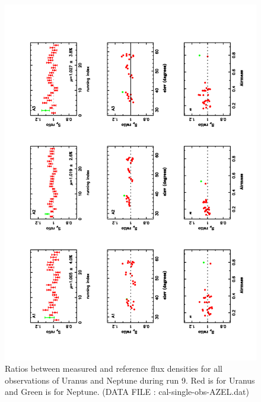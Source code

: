 \begin{figure}
\begin{center}
  \includegraphics[clip, angle=-90, scale=0.6]{Figures/Ura_Nep_ratio_index_elev_airmass.pdf}
  \caption{Ratios between measured and reference flux densities for all observations of Uranus and Neptune during run 9.
    Red is for Uranus and Green is for Neptune.  (DATA FILE : cal-single-obs-AZEL.dat)}
\label{fig:U_N_ratio}
\end{center}
\end{figure}

